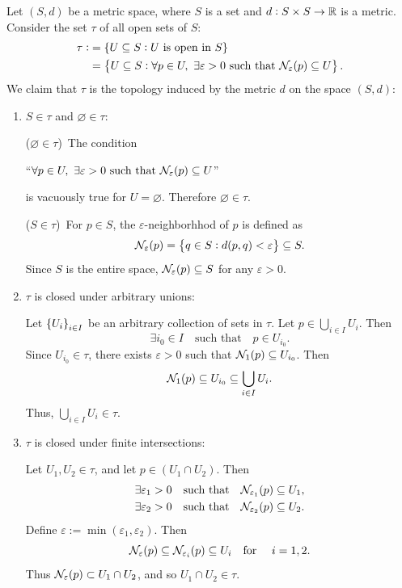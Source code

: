 \documentclass[11pt,openany]{article}
\begin{document}
\newpage
\begin{exercise*}
	Let $(S,d)$ be a metric space, where $S$ is a set and $d:S\times S\to\mathbb{R}$ is a metric. Consider the set $\tau$ of all open sets of $S$: \begin{align*}
	\tau:&=\set{U\subseteq S:U\ \text{is open in}\ S} \\
	&=\set{U\subseteq S:\forall p\in U,\ \exists\varepsilon>0\ \text{such that}\ \nbhd_\varepsilon(p)\subseteq U}.
	\end{align*} We claim that $\tau$ is the topology induced by the metric $d$ on the space $(S,d)$: \begin{enumerate}[(\text{O}1)]
	\item $S\in\tau$ and $\varnothing\in\tau$:
	
	($\varnothing\in\tau$)\ The condition \begin{center}
		``$\forall p\in U,\ \exists\varepsilon>0\ \text{such that}\ \nbhd_\varepsilon(p)\subseteq U$''
	\end{center} is vacuously true for $U=\varnothing$. Therefore $\varnothing\in\tau$.
	
	($S\in\tau$)\ For $p\in S$, the $\varepsilon$-neighborhhod of $p$ is defined as\[
	\mathcal{N}_\varepsilon(p)=\set{q\in S: d(p,q)<\varepsilon}\subseteq S.
	\] Since $S$ is the entire space, $\mathcal{N}_\varepsilon(p)\subseteq S$ for any 
	$\varepsilon>0$.
	\item $\tau$ is closed under arbitrary unions:
	
	Let $\set{U_i}_{i\in I}$ be an arbitrary collection of sets in $\tau$. Let $p\in\bigcup_{i\in I}U_i$. Then \[
	\exists i_0\in I\quad\text{such that}\quad p\in U_{i_0}.
	\] Since $U_{i_0}\in\tau$, there exists $\varepsilon>0$ such that $\mathcal{N}_1(p)\subseteq U_{i_0}$. Then \[
	\mathcal{N}_1(p)\subseteq U_{i_0}\subseteq\bigcup_{i\in I}U_i.
	\] Thus, $\bigcup_{i\in I}U_i\in\tau$.
	\item $\tau$ is closed under finite intersections:
	
	Let $U_1,U_2\in\tau$, and let $p\in (U_1\cap U_2)$. Then \begin{align*}
		\exists\varepsilon_1>0\quad\text{such that}\quad \mathcal{N}_{\varepsilon_1}(p)\subseteq U_1,\\
		\exists\varepsilon_2>0\quad\text{such that}\quad \mathcal{N}_{\varepsilon_2}(p)\subseteq U_2.
	\end{align*} Define $\varepsilon:=\min(\varepsilon_1,\varepsilon_2)$. Then \[
		\mathcal{N}_\varepsilon(p)\subseteq\mathcal{N}_{\varepsilon_i}(p)\subseteq U_i\quad\text{for }\quad i=1,2.
	\] Thus $\mathcal{N}_{\varepsilon}(p)\subset U_1\cap U_2$, and so $U_1\cap U_2\in\tau$.
\end{enumerate}
\end{exercise*}
\end{document}
